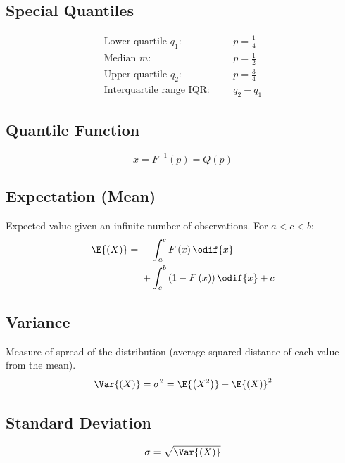 \documentclass{article}
\begin{document}
\begin{minipage}{126.1962963mm}
\begin{multicols}{2}
        \subsection{Special Quantiles}
        \begin{align*}
            \text{Lower quartile \(q_1\):}  &  &  & p = \frac{1}{4} \\
            \text{Median \(m\):}            &  &  & p = \frac{1}{2} \\
            \text{Upper quartile \(q_2\):}  &  &  & p = \frac{3}{4} \\
            \text{Interquartile range IQR:} &  &  & q_2 - q_1
        \end{align*}
        \subsection{Quantile Function}
        \begin{equation*}
            x = F^{-1}\left( p \right) = Q\left( p \right)
        \end{equation*}
        \subsection{Expectation (Mean)}
        Expected value given an infinite number of observations. For
        \(a < c < b\):
        \begin{equation*}
            \E{\left(X\right)} =
            \begin{aligned}[t]
                 & -\int_{a}^c F\left( x \right) \odif{x}                     \\
                 & + \int_c^b \left(1 - F\left( x \right)\right) \odif{x} + c
            \end{aligned}
        \end{equation*}
        \subsection{Variance}
        Measure of spread of the distribution (average squared distance
        of each value from the mean).
        \begin{equation*}
            \Var{\left( X \right)} = \sigma^2 = \E{\left( X^2 \right)} - \E{\left( X \right)}^2
        \end{equation*}
        \subsection{Standard Deviation}
        \begin{equation*}
            \sigma = \sqrt{\Var{\left( X \right)}}
        \end{equation*}
    \end{multicols}
\end{minipage}
\end{document}
